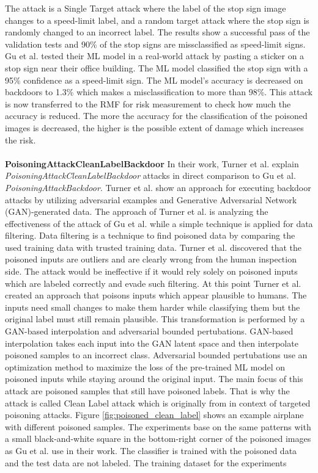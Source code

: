 The attack is a Single Target attack where the label of the stop sign image changes to a speed-limit label, and a random target attack where the stop sign is randomly changed to an incorrect label. The results show a successful pass of the validation tests and 90\% of the stop signs are missclassified as speed-limit signs. Gu et al. tested their ML model in a real-world attack by pasting a sticker on a stop sign near their office building. The ML model classified the stop sign with a 95\% confidence as a speed-limit sign. The ML model's accuracy is decreased on backdoors to 1.3\% which makes a misclassification to more than 98\%. This attack is now transferred to the RMF for risk measurement to check how much the accuracy is reduced. The more the accuracy for the classification of the poisoned images is decreased, the higher is the possible extent of damage which increases the risk. \\ \\
\textbf{PoisoningAttackCleanLabelBackdoor} In their work, Turner et al. \cite{turner2018clean} explain \textit{PoisoningAttackCleanLabelBackdoor} attacks in direct comparison to Gu et al. \textit{PoisoningAttackBackdoor}. Turner et al. show an approach for executing backdoor attacks by utilizing adversarial examples and Generative Adversarial Network (GAN)-generated data. The approach of Turner et al. is analyzing the effectiveness of the attack of Gu et al. while a simple technique is applied for data filtering. Data filtering is a technique to find poisoned data by comparing the used training data with trusted training data. Turner et al. discovered that the poisoned inputs are outliers and are clearly wrong from the human inspection side. The attack would be ineffective if it would rely solely on poisoned inputs which are labeled correctly and evade such filtering. At this point Turner et al. created an approach that poisons inputs which appear plausible to humans. The inputs need small changes to make them harder while classifying them but the original label must still remain plausible. This transformation is performed by a GAN-based interpolation and adversarial bounded pertubations. GAN-based interpolation takes each input into the GAN latent space \cite{DBLP:conf/nips/GoodfellowPMXWOCB14} and then interpolate poisoned samples to an incorrect class. Adversarial bounded pertubations use an optimization method to maximize the loss of the pre-trained ML model on poisoned inputs while staying around the original input. The main focus of this attack are poisoned samples that still have poisoned labels. That is why the attack is called Clean Label attack which is originally from \cite{DBLP:journals/corr/abs-1804-00792} in context of targeted poisoning attacks. Figure \ref{fig:poisoned_clean_label} shows an example airplane with different poisoned samples. The experiments base on the same patterns with a small black-and-white square in the bottom-right corner of the poisoned images as Gu et al. use in their work. The classifier is trained with the poisoned data and the test data are not labeled. The training dataset for the experiments
